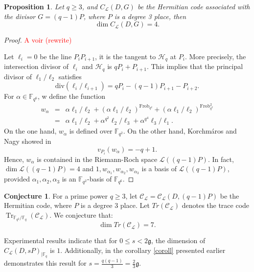 \documentclass[a4paper]{amsart}
\theoremstyle{plain}
\newtheorem{proposition}[theorem]{Proposition}
\theoremstyle{definition}
\newtheorem{conjecture}{Conjecture}[section]
\theoremstyle{remark}
\newcommand{\g}{\mathfrak{g}}
\DeclareMathOperator{\trace}{Tr}
\newcommand{\calC}{\mathcal{C}}
\begin{document}
\begin{proposition}

	Let $q\geq 3$, and $C_{\mathcal{L}}(D,G)$ be the Hermitian code associated with the divisor $G=(q-1)P$, where $P$ is a degree 3 place, then
	\[\dim C_{\mathcal{L}}(D,G)=4.\]
	
\end{proposition}

\begin{proof}
	\textcolor{red}{A voir (rewrite)}
	
	Let $\ell_i=0$ be the line $P_iP_{i+1}$, it is the tangent to $\mathscr{H}_q$ at $P_i$. More precisely, the intersection divisor of $\ell_i$ and $\mathscr{H}_q$ is $qP_i+P_{i+1}$. This implies that the principal divisor of $\ell_1/\ell_2$ satisfies
	\[\mathrm{div}(\ell_i/\ell_{i+1})=qP_i-(q-1)P_{i+1}-P_{i+2}.\]
	For $\alpha \in \mathbb{F}_{q^6}$, w define the function
	\begin{eqnarray*}
		w_\alpha&=&\alpha\ell_1/\ell_2+(\alpha\ell_1/\ell_2)^{\mathrm{Frob}_{q^2}}+(\alpha\ell_1/\ell_2)^{\mathrm{Frob}_{q^2}^2}\\
		&=&\alpha\ell_1/\ell_2+\alpha^{q^2}\ell_2/\ell_3+\alpha^{q^4}\ell_3/\ell_1.
	\end{eqnarray*}
	On the one hand, $w_\alpha$ is defined over $\mathbb{F}_{q^2}$. On the other hand, Korchm\'aros and Nagy showed in \cite[Theorem ~3.1]{korchmaros2013hermitian}
	\[v_{P_i}(w_\alpha)=-q+1.\]
	Hence, $w_\alpha$ is contained in the Riemann-Roch space $\mathcal{L}((q-1)P)$. In fact, $\dim\mathcal{L}((q-1)P)=4$ and $1,w_{\alpha_1}, w_{\alpha_2}, w_{\alpha_3}$ is a basis of $\mathcal{L}((q-1)P)$, provided $\alpha_1,\alpha_2,\alpha_3$ is an $\mathbb{F}_{q^2}$-basis of $\mathbb{F}_{q^6}$. 
\end{proof}







\begin{conjecture} 
	For a prime power $q \geq 3$, let  $\calC_{\mathcal{L}}=\calC_{\mathcal{L}}( D, (q-1)P)$ be the Hermitian code, where $P$ is a degree 3 place. Let $Tr(\calC_{\mathcal{L}})$ denotes the trace code $\trace_{\mathbb{F}_{q^2} / \mathbb{F}_q}(\calC_{\mathcal{L}})$. We conjecture that:
	\[\dim Tr(\calC_{\mathcal{L}}) = 7 .\]
\end{conjecture}


Experimental results indicate that for $0 \leq s < 2\mathfrak{g}$, the dimension of $C_{\mathcal{L}}(D,sP)_{\mid \mathbb{F}_q}$ is $1$. Additionally, in the corollary \ref{coroll} presented earlier demonstrates this result for $ s =\frac{q(q-1)}{3}=\frac{2}{3} \g$.
\end{document}
